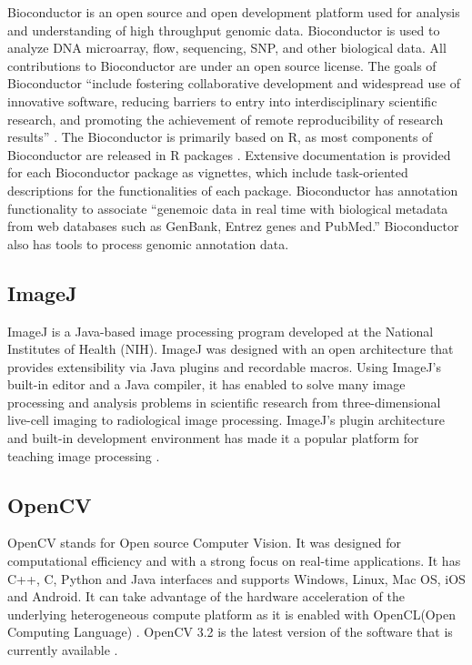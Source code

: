     Bioconductor is an open source and open development platform used
    for analysis and understanding of high throughput genomic
    data. Bioconductor is used to analyze DNA microarray, flow,
    sequencing, SNP, and other biological data. All contributions to
    Bioconductor are under an open source
    license. The goals of Bioconductor ``include fostering collaborative
    development and widespread use of innovative software,
    reducing barriers to entry into interdisciplinary scientific research,
    and promoting the achievement of remote reproducibility of
    research results'' \cite{bioconductor-article-2004}.
    The Bioconductor is primarily based on R, as most components
    of Bioconductor are released in R packages \cite{www-bioconductor-about}.
    Extensive documentation is provided for
    each Bioconductor package as vignettes, which include
    task-oriented descriptions for the functionalities of each
    package. Bioconductor has annotation functionality to associate
    ``genemoic data in real time with biological metadata from web
    databases such as GenBank, Entrez genes and PubMed.''  Bioconductor
    also has tools to process genomic annotation data.

    \pv

\subsection{ImageJ}

    ImageJ is a Java-based image processing program developed at the
    National Institutes of Health (NIH). ImageJ was designed with an
    open architecture that provides extensibility via Java plugins and
    recordable macros.  Using ImageJ's built-in editor and a Java
    compiler, it has enabled to solve many image processing and
    analysis problems in scientific research from three-dimensional
    live-cell imaging to radiological image processing.  ImageJ's
    plugin architecture and built-in development environment has made
    it a popular platform for teaching image
    processing \cite{www-imagej}.

\subsection{OpenCV}

    OpenCV stands for Open source Computer Vision. It was designed for
    computational efficiency and with a strong focus on real-time
    applications. It has C++, C, Python and Java interfaces and
    supports Windows, Linux, Mac OS, iOS and Android. It can take
    advantage of the hardware acceleration of the underlying
    heterogeneous compute platform as it is enabled with OpenCL(Open
    Computing Language) \cite{www-opencv}. OpenCV 3.2 is the latest
    version of the software that is currently available
    \cite{opencv-version}.

